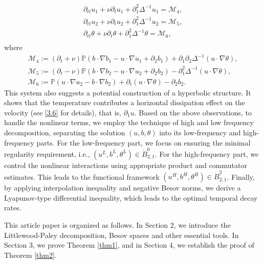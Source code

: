 \documentclass[10pt,a4paper]{amsart}
\numberwithin{equation}{section}
\begin{document}
\begin{equation} \label{1.1.4}
\begin{gathered}
 \partial_{tt}u_1+\nu\partial_tu_1+\partial_1^2\Delta^{-1}u_1=\mathcal{M}_4,\\
 \partial_{tt}u_2+\nu\partial_t u_2+\partial_1^2\Delta^{-1}u_2=\mathcal{M}_5,\\
 \partial_{tt}\theta+\nu\partial_t\theta+\partial_1^2\Delta^{-1}\theta=\mathcal{M}_6,\\
 \end{gathered}
\end{equation}
 where
\begin{gather*}
\mathcal{M}_4:=(\partial_t+\nu)\mathbb{P}(b\cdot\nabla b_1-u\cdot\nabla u_1+\partial_2b_1)+\partial_1\partial_2\Delta^{-1}(u\cdot\nabla\theta),\\
\mathcal{M}_5:=(\partial_t-\nu)\mathbb{P}(b\cdot\nabla b_2-u\cdot\nabla u_2+\partial_2b_2)-\partial_1^2\Delta^{-1}(u\cdot\nabla\theta),\\
\mathcal{M}_6:=\mathbb{P}(u\cdot\nabla u_2-b\cdot\nabla b_2)+\partial_t(u\cdot\nabla \theta)-\partial_2b_2.
\end{gather*}
This system also suggests a potential construction of a hyperbolic structure. It shows that the
temperature contributes a horizontal dissipation effect on the velocity (see \eqref{3.6} for details),
that is, $\partial_1u$. Based on the above observations, to handle the nonlinear terms, we employ
the technique of high and low frequency decomposition, separating the solution $(u,b,\theta)$ into
its low-frequency and high-frequency parts. For the low-frequency part, we focus on ensuring the
minimal regularity requirement, i.e., $(u^L,b^L,\theta^L)\in\dot{B}^0_{2,1}$. For the high-frequency part,
we control the nonlinear interactions using appropriate product and commutator estimates.
This leads to the functional framework $(u^H,b^H,\theta^H)\in\dot{B}^2_{2,1}$. Finally, by applying interpolation inequality and negative Besov norms, we derive a Lyapunov-type differential inequality,
which leads to the optimal temporal decay rates.

This article paper is organized as follows. In Section 2, we introduce the Littlewood-Paley
decomposition, Besov spaces and other essential tools. In Section 3, we prove
Theorem \ref{thm1}, and in Section 4, we establish the proof of Theorem \ref{thm2}.
\end{document}
